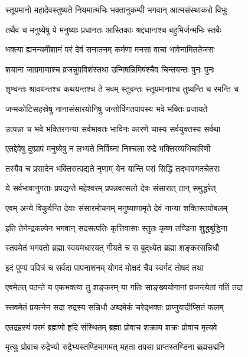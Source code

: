 \twolineshloka
{स्तूयमानो महादेवस्तुष्यते नियमात्मभिः}%
{भक्तानुकम्पी भगवान् आत्मसंस्थाकरो विभुः}%


\twolineshloka
{तथैव च मनुष्येषु ये मनुष्याः प्रधानतः}%
{आस्तिकाः श्रद्दधानाश्च बहुभिर्जन्मभिः स्तवैः}%


\twolineshloka
{भक्त्या ह्यनन्यमीशानं परं देवं सनातनम्}%
{कर्मणा मनसा वाचा भावेनामिततेजसः}%


\twolineshloka
{शयाना जाग्रमाणाश्च व्रजन्नुपविशंस्तथा}%
{उन्मिषन्निमिषंश्चैव चिन्तयन्तः पुनः पुनः}%

\twolineshloka
{शृण्वन्तः श्रावयन्तश्च कथयन्तश्च ते भवम्}%
{स्तुवन्तः स्तूयमानाश्च तुष्यन्ति च रमन्ति च}%


\twolineshloka
{जन्मकोटिसहस्रेषु नानासंसारयोनिषु}%
{जन्तोर्विगतपापस्य भवे भक्तिः प्रजायते}%


\twolineshloka
{उत्पन्ना च भवे भक्तिरनन्या सर्वभावतः}%
{भाविनः कारणे चास्य सर्वयुक्तस्य सर्वथा}%


\twolineshloka
{एतद्देवेषु दुष्प्रापं मनुष्येषु न लभ्यते}%
{निर्विघ्ना निश्चला रुद्रे भक्तिरव्यभिचारिणी}

\twolineshloka
{तस्यैव च प्रसादेन भक्तिरुत्पद्यते नृणाम्}%
{येन यान्ति परां सिद्धिं तद्भावगतचेतसः}%

\twolineshloka
{ये सर्वभावानुगताः प्रपद्यन्ते महेश्वरम्}%
{प्रपन्नवत्सलो देवः संसारात् तान् समुद्धरेत्}%

\twolineshloka
{एवम् अन्ये विकुर्वन्ति देवाः संसारमोचनम्}%
{मनुष्याणामृते देवं नान्या शक्तिस्तपोबलम्}%

\twolineshloka
{इति तेनेन्द्रकल्पेन भगवान् सदसत्पतिः}%
{कृत्तिवासाः स्तुतः कृष्ण तण्डिना शुद्धबुद्धिना}%

\twolineshloka
{स्तवमेतं  भगवतो ब्रह्मा स्वयमधारयत्}%
{गीयते च स बुद्‌ध्येत ब्रह्मा शङ्करसन्निधौ}%

\twolineshloka
{इदं पुण्यं पवित्रं च सर्वदा पापनाशनम्}%
{योगदं मोक्षदं चैव स्वर्गदं तोषदं तथा}%

\twolineshloka
{एवमेतत् पठन्ते य एकभक्त्या तु शङ्करम्}%
{या गतिः साङ्ख्ययोगानां व्रजन्त्येतां गतिं तदा}%

\twolineshloka
{स्तवमेतं प्रयत्नेन सदा रुद्रस्य सन्निधौ}%
{अब्दमेकं चरेद्भक्तः प्राप्नुयादीप्सितं फलम्}%

\twolineshloka
{एतद्रहस्यं परमं ब्रह्मणो हृदि संस्थितम्}%
{ब्रह्मा प्रोवाच शक्राय शक्रः प्रोवाच मृत्यवे}%

\twolineshloka
{मृत्युः प्रोवाच रुद्रेभ्यो रुद्रेभ्यस्तण्डिमागमत्}%
{महता तपसा प्राप्तस्तण्डिना ब्रह्मसद्मनि}%

